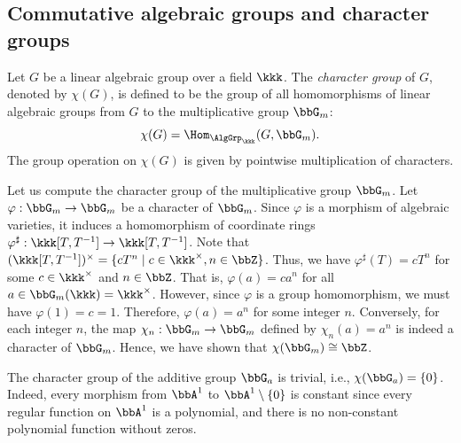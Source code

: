 
\subsection{Commutative algebraic groups and character groups}

    \begin{definition}\label{def:character_group_of_linear_algebraic_group}
        Let \(G\) be a linear algebraic group over a field \(\kkk\). 
        The \emph{character group} of \(G\), denoted by \(\chi(G)\), is defined to be the group of all homomorphisms of linear algebraic groups from \(G\) to the multiplicative group \(\bbG_m\):
        \[
            \chi(G) = \Hom_{\AlgGrp_\kkk}(G, \bbG_m).
        \]
        The group operation on \(\chi(G)\) is given by pointwise multiplication of characters.
    \end{definition}

    \begin{example}\label{eg:character_group_of_G_m}
        Let us compute the character group of the multiplicative group \(\bbG_m\).
        Let \(\varphi: \bbG_m \to \bbG_m\) be a character of \(\bbG_m\). 
        Since \(\varphi\) is a morphism of algebraic varieties, it induces a homomorphism of coordinate rings \(\varphi^\sharp: \kkk[T, T^{-1}] \to \kkk[T, T^{-1}]\).
        Note that \((\kkk[T, T^{-1}])^\times = \{ c T^n \mid c \in \kkk^\times, n \in \bbZ \}\). 
        Thus, we have \(\varphi^\sharp(T) = c T^n\) for some \(c \in \kkk^\times\) and \(n \in \bbZ\).
        That is, \(\varphi(a) = c a^n\) for all \(a \in \bbG_m(\kkk) = \kkk^\times\). 
        However, since \(\varphi\) is a group homomorphism, we must have \(\varphi(1) = c = 1\). 
        Therefore, \(\varphi(a) = a^n\) for some integer \(n\). 
        Conversely, for each integer \(n\), the map \(\chi_n: \bbG_m \to \bbG_m\) defined by \(\chi_n(a) = a^n\) is indeed a character of \(\bbG_m\). 
        Hence, we have shown that \(\chi(\bbG_m) \cong \bbZ\).
    \end{example}

    \begin{example}\label{eg:character_group_of_G_a}
        The character group of the additive group \(\bbG_a\) is trivial, i.e., \(\chi(\bbG_a) = \{0\}\).
        Indeed, every morphism from \(\bbA^1\) to \(\bbA^1 \setminus \{0\}\) is constant since every regular function on \(\bbA^1\) is a polynomial, and there is no non-constant polynomial function without zeros.
    \end{example}


